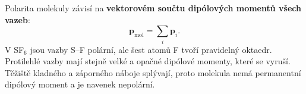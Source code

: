 Polarita molekuly závisí na \textbf{vektorovém součtu dipólových momentů všech vazeb}:
\[\boldsymbol p_{\mathrm{mol}}=\sum_i\boldsymbol p_i.\]
V SF$_6$ jsou vazby S--F polární, ale šest atomů F tvoří pravidelný oktaedr. Protilehlé vazby mají stejně velké a opačné dipólové momenty, které se vyruší. Těžiště kladného a záporného náboje splývají, proto molekula nemá permanentní dipólový moment a je navenek nepolární.
